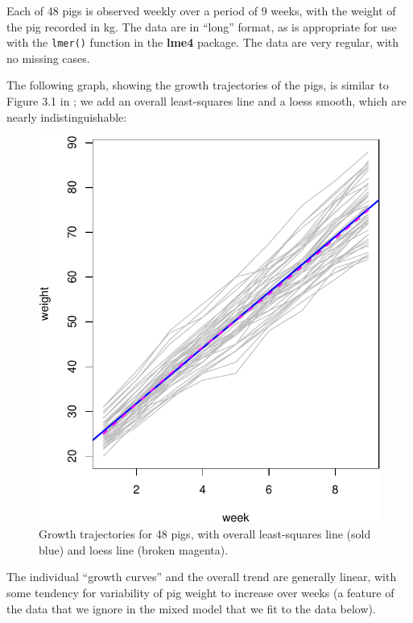 \documentclass[
]{jss}
\begin{document}
Each of 48 pigs is observed weekly over a period of 9 weeks, with the
weight of the pig recorded in kg. The data are in ``long'' format, as is
appropriate for use with the \texttt{lmer()} function in the
\textbf{lme4} package. The data are very regular, with no missing cases.

The following graph, showing the growth trajectories of the pigs, is
similar to Figure 3.1 in \citet{DiggleLiangZeger:1994}; we add an
overall least-squares line and a loess smooth, which are nearly
indistinguishable:

\begin{CodeChunk}
\begin{figure}

{\centering \includegraphics[width=0.6\linewidth]{JSS-article_files/figure-latex/pigs-graph-1} 

}

\caption[Growth trajectories for 48 pigs, with overall least-squares line (sold blue) and loess line (broken magenta)]{Growth trajectories for 48 pigs, with overall least-squares line (sold blue) and loess line (broken magenta).}\label{fig:pigs-graph}
\end{figure}
\end{CodeChunk}

The individual ``growth curves'' and the overall trend are generally
linear, with some tendency for variability of pig weight to increase
over weeks (a feature of the data that we ignore in the mixed model that
we fit to the data below).
\end{document}
